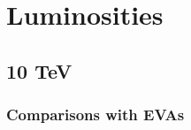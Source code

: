 \documentclass[a4paper,11pt]{article}
\begin{document}
\clearpage
\section{Luminosities}

\subsection{10 TeV}



\clearpage
\subsubsection{Comparisons with EVAs}


\end{document}
